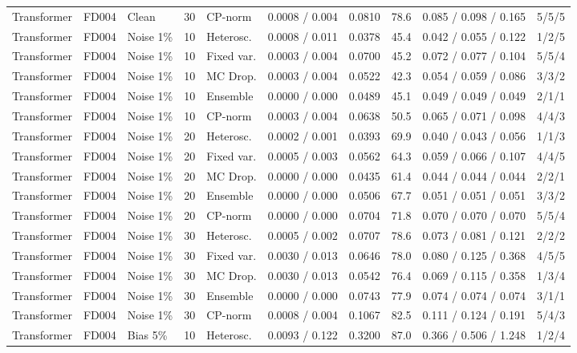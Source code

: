 \documentclass[10pt,a4paper]{article}
\begin{document}
\begin{landscape}
\begin{center}
\begin{longtable}{lllllcclll}
Transformer & FD004 & Clean & 30 & CP-norm & 0.0008 / 0.004 & 0.0810 & 78.6 & 0.085 / 0.098 / 0.165 & 5/5/5 \\
Transformer & FD004 & Noise 1\% & 10 & Heterosc. & 0.0008 / 0.011 & 0.0378 & 45.4 & 0.042 / 0.055 / 0.122 & 1/2/5 \\
Transformer & FD004 & Noise 1\% & 10 & Fixed var. & 0.0003 / 0.004 & 0.0700 & 45.2 & 0.072 / 0.077 / 0.104 & 5/5/4 \\
Transformer & FD004 & Noise 1\% & 10 & MC Drop. & 0.0003 / 0.004 & 0.0522 & 42.3 & 0.054 / 0.059 / 0.086 & 3/3/2 \\
Transformer & FD004 & Noise 1\% & 10 & Ensemble & 0.0000 / 0.000 & 0.0489 & 45.1 & 0.049 / 0.049 / 0.049 & 2/1/1 \\
Transformer & FD004 & Noise 1\% & 10 & CP-norm & 0.0003 / 0.004 & 0.0638 & 50.5 & 0.065 / 0.071 / 0.098 & 4/4/3 \\
Transformer & FD004 & Noise 1\% & 20 & Heterosc. & 0.0002 / 0.001 & 0.0393 & 69.9 & 0.040 / 0.043 / 0.056 & 1/1/3 \\
Transformer & FD004 & Noise 1\% & 20 & Fixed var. & 0.0005 / 0.003 & 0.0562 & 64.3 & 0.059 / 0.066 / 0.107 & 4/4/5 \\
Transformer & FD004 & Noise 1\% & 20 & MC Drop. & 0.0000 / 0.000 & 0.0435 & 61.4 & 0.044 / 0.044 / 0.044 & 2/2/1 \\
Transformer & FD004 & Noise 1\% & 20 & Ensemble & 0.0000 / 0.000 & 0.0506 & 67.7 & 0.051 / 0.051 / 0.051 & 3/3/2 \\
Transformer & FD004 & Noise 1\% & 20 & CP-norm & 0.0000 / 0.000 & 0.0704 & 71.8 & 0.070 / 0.070 / 0.070 & 5/5/4 \\
Transformer & FD004 & Noise 1\% & 30 & Heterosc. & 0.0005 / 0.002 & 0.0707 & 78.6 & 0.073 / 0.081 / 0.121 & 2/2/2 \\
Transformer & FD004 & Noise 1\% & 30 & Fixed var. & 0.0030 / 0.013 & 0.0646 & 78.0 & 0.080 / 0.125 / 0.368 & 4/5/5 \\
Transformer & FD004 & Noise 1\% & 30 & MC Drop. & 0.0030 / 0.013 & 0.0542 & 76.4 & 0.069 / 0.115 / 0.358 & 1/3/4 \\
Transformer & FD004 & Noise 1\% & 30 & Ensemble & 0.0000 / 0.000 & 0.0743 & 77.9 & 0.074 / 0.074 / 0.074 & 3/1/1 \\
Transformer & FD004 & Noise 1\% & 30 & CP-norm & 0.0008 / 0.004 & 0.1067 & 82.5 & 0.111 / 0.124 / 0.191 & 5/4/3 \\
Transformer & FD004 & Bias 5\% & 10 & Heterosc. & 0.0093 / 0.122 & 0.3200 & 87.0 & 0.366 / 0.506 / 1.248 & 1/2/4 \\

\end{longtable}
\end{center}
\end{landscape}
\end{document}

